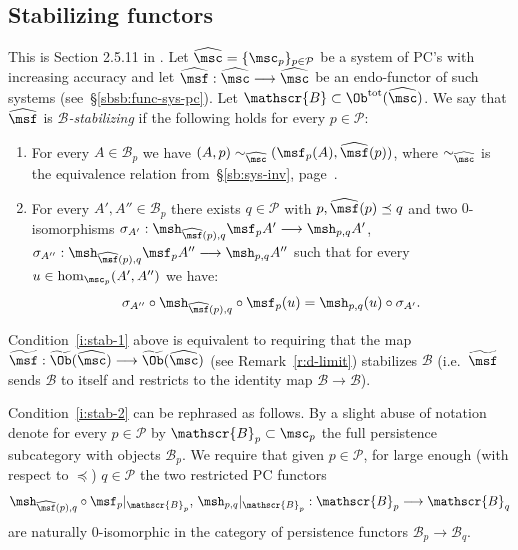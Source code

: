 \subsection{Stabilizing functors} \label{sbsb:sfunc} This is Section 2.5.11 in \cite{ABC26}. Let
  $\widehat{\msc} = \{ \msc_p\}_{p \in \mathcal{P}}$ be a system of
  PC's with increasing accuracy and let
  $\widehat{\msf}: \widehat{\msc} \longrightarrow \widehat{\msc}$ be
  an endo-functor of such systems (see~\S\ref{sbsb:func-sys-pc}). Let
  $\mathscr{B} \subset \Ob^{\text{tot}}(\widehat{\msc})$. We say that
  $\widehat{\msf}$ is {\em $\mathscr{B}$-stabilizing} if the following
  holds for every $p \in \mathcal{P}$:
  \begin{enumerate}
  \item \label{i:stab-1} For every $A \in \mathscr{B}_p$ we have
    $(A,p) \sim_{\widehat{\msc}} (\msf_p(A), \widehat{\msf}(p))$,
    where $\sim_{\widehat{\msc}}$ is the equivalence relation
    from~\S\ref{sb:sys-inv}, page~\pageref{p:equiv-ob}.
  \item \label{i:stab-2} For every $A', A'' \in \mathscr{B}_p$ there
    exists $q \in \mathcal{P}$ with $p, \widehat{\msf}(p) \preceq q$
    and two $0$-isomorphisms
    $\sigma_{A'}: \msh_{\widehat{\msf}(p), q} \msf_p A'
    \longrightarrow \msh_{p,q}A'$,
    $\sigma_{A''}: \msh_{\widehat{\msf}(p), q} \msf_p A''
    \longrightarrow \msh_{p,q}A''$ such that for every
    $u \in \hom_{\msc_p}(A',A'')$ we have:
    \begin{equation} \label{eq:stab-2} \sigma_{A''} \circ
      \msh_{\widehat{\msf}(p), q} \circ \msf_p(u) = \msh_{p,q}(u)
      \circ \sigma_{A'}.
    \end{equation}
  \end{enumerate}

\begin{rem} \label{r:stab-func} 
Condition~\eqref{i:stab-1}
    above is equivalent to requiring that the map
    $\widetilde{\msf}: \widetilde{\Ob}(\widehat{\msc}) \longrightarrow
    \widetilde{\Ob}(\widehat{\msc})$ (see Remark~\ref{r:d-limit})
    stabilizes $\mathscr{B}$ (i.e.~$\widetilde{\msf}$ sends
    $\mathscr{B}$ to itself and restricts to the identity map
    $\mathscr{B} \longrightarrow \mathscr{B}$).

  Condition~\eqref{i:stab-2} can be rephrased as follows. By a
    slight abuse of notation denote for every $p \in \mathcal{P}$ by
    $\mathscr{B}_p \subset \msc_p$ the full persistence subcategory
    with objects $\mathscr{B}_p$. We require that given
    $p \in \mathcal{P}$, for large enough (with respect to $\preceq$)
    $q \in \mathcal{P}$ the two restricted PC functors
    $$\msh_{\widehat{\msf}(p), q} \circ \msf_p|_{\mathscr{B}_p}, \, 
    \msh_{p,q}|_{\mathscr{B}_p}: \mathscr{B}_p \longrightarrow
    \mathscr{B}_q$$ are naturally $0$-isomorphic in the category of
    persistence functors
    $\mathscr{B}_p \longrightarrow \mathscr{B}_q$.
  \end{rem}

